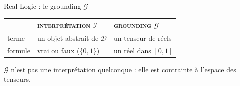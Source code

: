 \documentclass[aspectratio=169,10pt]{beamer}
\begin{document}
\begin{frame}{Real Logic : le grounding $\mathcal{G}$}
  \begin{center}
  \footnotesize
  \renewcommand{\arraystretch}{1.8}
  \begin{tabular}{@{} l >{\centering\arraybackslash}m{2.8cm}
                       >{\centering\arraybackslash}m{2.8cm} @{}}
    \toprule
    & {\color{ash}\scshape\footnotesize interprétation $\mathcal{I}$} &
      {\color{accent}\scshape\footnotesize grounding $\mathcal{G}$} \\
    \midrule
    terme & un objet abstrait de $\mathcal{D}$ & un tenseur de réels \\
    formule & vrai ou faux ($\{0,1\}$) & un réel dans $[0,1]$ \\
    \bottomrule
  \end{tabular}
  \end{center}

  \vspace{0.7em}
  \begin{center}
    \small $\mathcal{G}$ n'est pas une interprétation quelconque : elle est
    \alert{contrainte} à l'espace des tenseurs.
  \end{center}
\end{frame}
\end{document}
